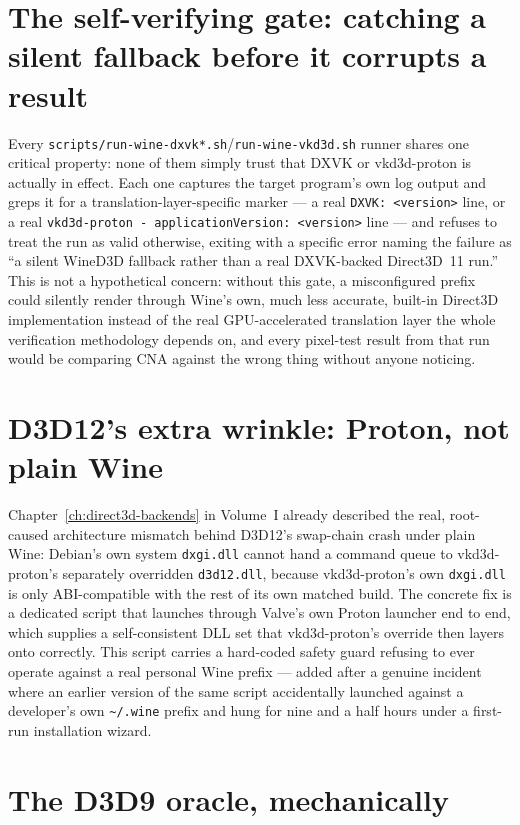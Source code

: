 \section{The self-verifying gate: catching a silent fallback before it corrupts a result}

Every \texttt{scripts/run-wine-dxvk*.sh}/\texttt{run-wine-vkd3d.sh} runner shares one
critical property: none of them simply trust that DXVK or vkd3d-proton is actually in effect.
Each one captures the target program's own log output and greps it for a translation-layer-specific
marker --- a real \texttt{DXVK: <version>} line, or a real \texttt{vkd3d-proton -
applicationVersion: <version>} line --- and refuses to treat the run as valid otherwise,
exiting with a specific error naming the failure as ``a silent WineD3D fallback rather than a
real DXVK-backed Direct3D~11 run.'' This is not a hypothetical concern: without this gate, a
misconfigured prefix could silently render through Wine's own, much less accurate, built-in
Direct3D implementation instead of the real GPU-accelerated translation layer the whole
verification methodology depends on, and every pixel-test result from that run would be
comparing CNA against the wrong thing without anyone noticing.

\section{D3D12's extra wrinkle: Proton, not plain Wine}

Chapter~\ref{ch:direct3d-backends} in Volume~I already described the real, root-caused
architecture mismatch behind D3D12's swap-chain crash under plain Wine: Debian's own system
\texttt{dxgi.dll} cannot hand a command queue to vkd3d-proton's separately overridden
\texttt{d3d12.dll}, because vkd3d-proton's own \texttt{dxgi.dll} is only ABI-compatible with
the rest of its own matched build. The concrete fix is a dedicated script that launches
through Valve's own Proton launcher end to end, which supplies a self-consistent DLL set that
vkd3d-proton's override then layers onto correctly. This script carries a hard-coded safety
guard refusing to ever operate against a real personal Wine prefix --- added after a genuine
incident where an earlier version of the same script accidentally launched against a
developer's own \texttt{\textasciitilde/.wine} prefix and hung for nine and a half hours
under a first-run installation wizard.

\section{The D3D9 oracle, mechanically}
\label{sec:d3d9-oracle}

